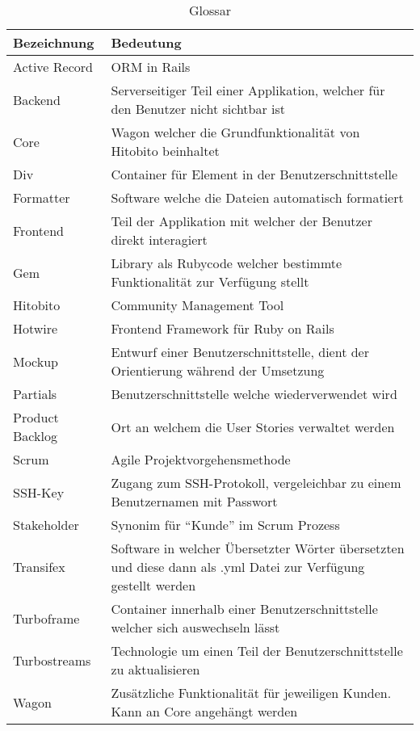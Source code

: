 \begin{table}[H]
    \begin{tabular}{|L{0.3\textwidth}|L{0.6\textwidth}|}
        \hline
         \textbf{\color{white}Bezeichnung} & \textbf{\color{white}Bedeutung} \\[12pt]
        \hline
        Active Record & ORM in Rails \\
        \hline
        Backend & Serverseitiger Teil einer Applikation, welcher für den Benutzer nicht sichtbar ist \\
        \hline
        Core & Wagon welcher die Grundfunktionalität von Hitobito beinhaltet \\
        \hline 
        Div & Container für Element in der Benutzerschnittstelle \\
        \hline
        Formatter & Software welche die Dateien automatisch formatiert \\
        \hline
        Frontend & Teil der Applikation mit welcher der Benutzer direkt interagiert \\
        \hline
        Gem & Library als Rubycode welcher bestimmte Funktionalität zur Verfügung stellt \\
        \hline
        Hitobito & Community Management Tool \\
        \hline
        Hotwire & Frontend Framework für Ruby on Rails \\
        \hline
        Mockup & Entwurf einer Benutzerschnittstelle, dient der Orientierung während der Umsetzung \\
        \hline
        Partials & Benutzerschnittstelle welche wiederverwendet wird \\
        \hline
        Product Backlog & Ort an welchem die User Stories verwaltet werden \\
        \hline
        Scrum & Agile Projektvorgehensmethode \\
        \hline
        SSH-Key & Zugang zum SSH-Protokoll, vergeleichbar zu einem Benutzernamen mit Passwort \\
        \hline
        Stakeholder & Synonim für ``Kunde'' im Scrum Prozess \\
        \hline
        Transifex & Software in welcher Übersetzter Wörter übersetzten und diese dann als .yml Datei zur Verfügung gestellt werden \\
        \hline
        Turboframe & Container innerhalb einer Benutzerschnittstelle welcher sich auswechseln lässt \\
        \hline
        Turbostreams & Technologie um einen Teil der Benutzerschnittstelle zu aktualisieren \\
        \hline
        Wagon & Zusätzliche Funktionalität für jeweiligen Kunden. Kann an Core angehängt werden \\
        \hline
    \end{tabular}
    \caption{Glossar}
\end{table}

